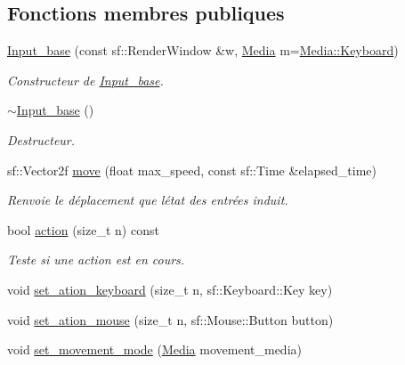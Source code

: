 \subsection*{Fonctions membres publiques}
\begin{DoxyCompactItemize}
\item 
\hyperlink{class_input__base_a4e1efd96da3e870a9b2f6613b99e6c00}{Input\+\_\+base} (const sf\+::\+Render\+Window \&w, \hyperlink{class_input__base_a455585e7933485981b3d7bfcad3a47c6}{Media} m=\hyperlink{class_input__base_a455585e7933485981b3d7bfcad3a47c6a6ce4d85a628a88bbdb3ac24a8e5a9c2e}{Media\+::\+Keyboard})
\begin{DoxyCompactList}\small\item\em Constructeur de \hyperlink{class_input__base}{Input\+\_\+base}. \end{DoxyCompactList}\item 
\hyperlink{class_input__base_a7dabafa58d0e4bd94a84562900d06a5e}{$\sim$\+Input\+\_\+base} ()
\begin{DoxyCompactList}\small\item\em Destructeur. \end{DoxyCompactList}\item 
sf\+::\+Vector2f \hyperlink{class_input__base_a61bba67b702dfd77db2091409ab1d20b}{move} (float max\+\_\+speed, const sf\+::\+Time \&elapsed\+\_\+time)
\begin{DoxyCompactList}\small\item\em Renvoie le déplacement que l\textquotesingle{}état des entrées induit. \end{DoxyCompactList}\item 
bool \hyperlink{class_input__base_a2ac741377832fd670954dba5abf82a10}{action} (size\+\_\+t n) const
\begin{DoxyCompactList}\small\item\em Teste si une action est en cours. \end{DoxyCompactList}\item 
void \hyperlink{class_input__base_a4c0631d64c47b84db480a9098f5a8e1b}{set\+\_\+ation\+\_\+keyboard} (size\+\_\+t n, sf\+::\+Keyboard\+::\+Key key)
\item 
void \hyperlink{class_input__base_a302f14b88b743a1b6510d632c141971f}{set\+\_\+ation\+\_\+mouse} (size\+\_\+t n, sf\+::\+Mouse\+::\+Button button)
\item 
void \hyperlink{class_input__base_a103633f42d3fa58352a12b54ed4b3faf}{set\+\_\+movement\+\_\+mode} (\hyperlink{class_input__base_a455585e7933485981b3d7bfcad3a47c6}{Media} movement\+\_\+media)
\end{DoxyCompactItemize}


